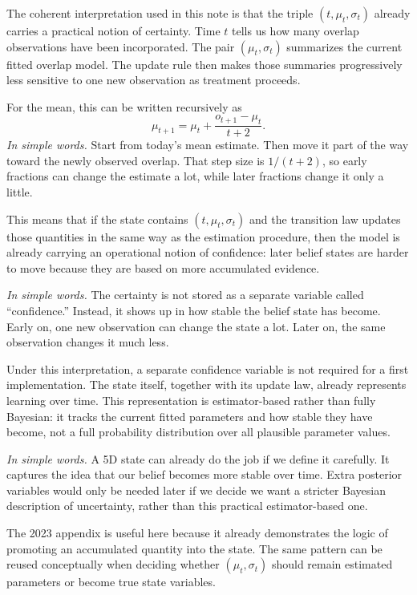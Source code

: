\documentclass[11pt]{article}
\begin{document}
The coherent interpretation used in this note is that the triple $(t,\mu_t,\sigma_t)$ already carries a practical notion of certainty. Time $t$ tells us how many overlap observations have been incorporated. The pair $(\mu_t,\sigma_t)$ summarizes the current fitted overlap model. The update rule then makes those summaries progressively less sensitive to one new observation as treatment proceeds.

For the mean, this can be written recursively as
\[
\mu_{t+1} = \mu_t + \frac{o_{t+1}-\mu_t}{t+2}.
\]
\noindent\textit{In simple words.} Start from today's mean estimate. Then move it part of the way toward the newly observed overlap. That step size is $1/(t+2)$, so early fractions can change the estimate a lot, while later fractions change it only a little.

This means that if the state contains $(t,\mu_t,\sigma_t)$ and the transition law updates those quantities in the same way as the estimation procedure, then the model is already carrying an operational notion of confidence: later belief states are harder to move because they are based on more accumulated evidence.

\noindent\textit{In simple words.} The certainty is not stored as a separate variable called ``confidence.'' Instead, it shows up in how stable the belief state has become. Early on, one new observation can change the state a lot. Later on, the same observation changes it much less.

Under this interpretation, a separate confidence variable is not required for a first implementation. The state itself, together with its update law, already represents learning over time. This representation is estimator-based rather than fully Bayesian: it tracks the current fitted parameters and how stable they have become, not a full probability distribution over all plausible parameter values.

\noindent\textit{In simple words.} A 5D state can already do the job if we define it carefully. It captures the idea that our belief becomes more stable over time. Extra posterior variables would only be needed later if we decide we want a stricter Bayesian description of uncertainty, rather than this practical estimator-based one.

The 2023 appendix is useful here because it already demonstrates the logic of promoting an accumulated quantity into the state. The same pattern can be reused conceptually when deciding whether $(\mu_t,\sigma_t)$ should remain estimated parameters or become true state variables.
\end{document}
